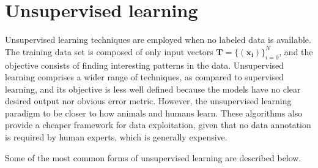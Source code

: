 \section{Unsupervised learning}
Unsupervised learning techniques are employed when no labeled data is available. The training data set is composed of only input vectors $\mathbf{T}=\{(\mathbf{x_i})\}_{i=0}^{N}$, and the objective consists of finding interesting patterns in the data. Unsupervised learning comprises a wider range of techniques, as compared to supervised learning, and its objective is less well defined because the models have no clear desired output nor obvious error metric. However, the unsupervised learning paradigm to be closer to how animals and humans learn. These algorithms also provide a cheaper framework for data exploitation, given that no data annotation is required by human experts, which is generally expensive. 

Some of the most common forms of unsupervised learning are described below.

